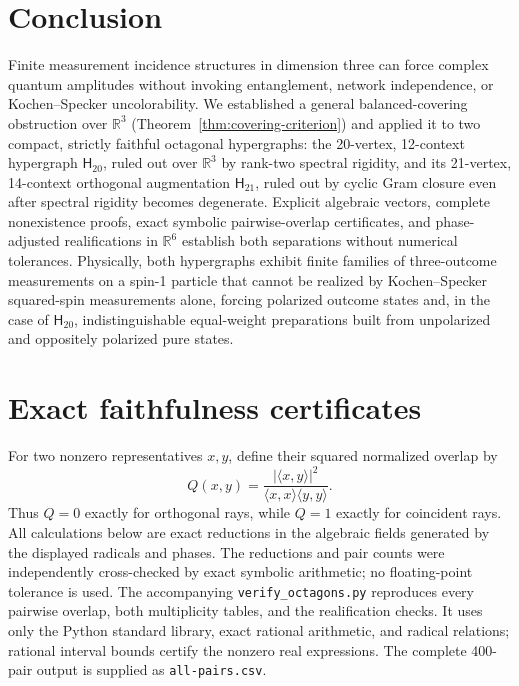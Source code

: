 \documentclass[twocolumn,aps,pra,floatfix,amsmath,amssymb,longbibliography]{revtex4-2}
\newenvironment{handrewrite}{\leavevmode\color{blue}}{}
\theoremstyle{definition}
\theoremstyle{remark}
\newcommand{\R}{\mathbb R}
\newcommand{\Htwenty}{\mathsf H_{20}}
\newcommand{\Htwentyone}{\mathsf H_{21}}
\begin{document}
\section{Conclusion}
\label{sec:conclusion}

\begin{handrewrite}
Finite measurement incidence structures in dimension three can force complex
quantum amplitudes without invoking entanglement, network independence, or
Kochen--Specker uncolorability.  We established a general balanced-covering
obstruction over $\R^3$ (Theorem~\ref{thm:covering-criterion}) and applied it
to two compact, strictly faithful octagonal hypergraphs: the 20-vertex,
12-context hypergraph $\Htwenty$, ruled out over $\R^3$ by rank-two spectral
rigidity, and its 21-vertex, 14-context orthogonal augmentation $\Htwentyone$,
ruled out by cyclic Gram closure even after spectral rigidity becomes
degenerate.  Explicit algebraic vectors, complete nonexistence proofs, exact
symbolic pairwise-overlap certificates, and phase-adjusted realifications in
$\R^6$ establish both separations without numerical tolerances.  Physically,
both hypergraphs exhibit finite families of three-outcome measurements on a
spin-1 particle that cannot be realized by Kochen--Specker squared-spin
measurements alone, forcing polarized outcome states and, in the case of
$\Htwenty$, indistinguishable equal-weight preparations built from unpolarized
and oppositely polarized pure states.
\end{handrewrite}

\appendix

\section{Exact faithfulness certificates}
\label{app:faithfulness}

For two nonzero representatives $x,y$, define their squared normalized
overlap by
\begin{equation}
 Q(x,y)=\frac{|\langle x,y\rangle|^2}
 {\langle x,x\rangle\langle y,y\rangle}.
 \label{eq:Q}
\end{equation}
Thus $Q=0$ exactly for orthogonal rays, while $Q=1$ exactly for
coincident rays.  All calculations below are exact reductions in the
algebraic fields generated by the displayed radicals and phases.  The
reductions and pair counts were independently cross-checked by exact symbolic
arithmetic; no floating-point tolerance is used.
The accompanying \texttt{verify\_octagons.py} reproduces every pairwise
overlap, both multiplicity tables, and the realification checks.  It uses
only the Python standard library, exact rational arithmetic, and radical
relations; rational interval bounds certify the nonzero real expressions.
The complete 400-pair output is supplied as \texttt{all-pairs.csv}.
\end{document}
